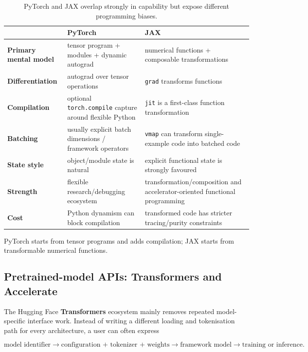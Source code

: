 \begin{table}[ht]
\centering
\small
\begin{tabularx}{\textwidth}{>{\bfseries}p{2.1cm} X X}
\toprule
 & PyTorch & JAX \\
\midrule
Primary mental model & tensor program + modules + dynamic autograd & numerical functions + composable transformations \\
Differentiation & autograd over tensor operations & \texttt{grad} transforms functions \\
Compilation & optional \texttt{torch.compile} capture around flexible Python & \texttt{jit} is a first-class function transformation \\
Batching & usually explicit batch dimensions / framework operators & \texttt{vmap} can transform single-example code into batched code \\
State style & object/module state is natural & explicit functional state is strongly favoured \\
Strength & flexible research/debugging ecosystem & transformation/composition and accelerator-oriented functional programming \\
Cost & Python dynamism can block compilation & transformed code has stricter tracing/purity constraints \\
\bottomrule
\end{tabularx}
\caption{PyTorch and JAX overlap strongly in capability but expose different programming biases.}
\label{tab:pytorch-jax}
\end{table}

\begin{calloutmemoryhook}
PyTorch starts from tensor programs and adds compilation; JAX starts from transformable numerical functions.
\end{calloutmemoryhook}


\subsection{Pretrained-model APIs: Transformers and Accelerate}

The Hugging Face \textbf{Transformers} ecosystem mainly removes repeated model-specific interface work.
Instead of writing a different loading and tokenisation path for every architecture, a user can often express

\[
\text{model identifier}
\rightarrow
\text{configuration + tokenizer + weights}
\rightarrow
\text{framework model}
\rightarrow
\text{training or inference}.
\]


